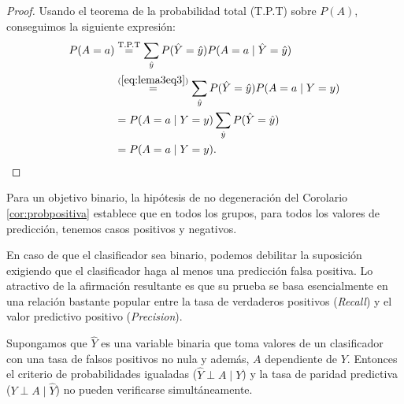 \documentclass[oneside,openright,titlepage,numbers=noenddot,openany,headinclude,footinclude=true,
cleardoublepage=empty,abstractoff,BCOR=5mm,paper=a4,fontsize=12pt,main=spanish]{scrreprt}
\begin{document}
\begin{proof}
Usando el teorema de la probabilidad total (T.P.T) sobre $P(A)$, conseguimos la siguiente expresión:
\begin{equation*}
\begin{split}
P(A=a)&\overset{\text{T.P.T}}{=}\sum_{\hat{y}}P(\hat{Y}=\hat{y})P(A=a \mid \hat{Y}=\hat{y})\\
&\overset{(\ref{eq:lema3eq3})}{=}\sum_{\hat{y}}P(\hat{Y}=\hat{y})P(A=a \mid Y=y)\\
&=P(A=a \mid Y=y)\sum_{\hat{y}}P(\hat{Y}=\hat{y})\\
&=P(A=a \mid Y=y).
\end{split}
\end{equation*}
\end{proof}

Para un objetivo binario, la hipótesis de no degeneración del Corolario  \ref{cor:probpositiva} establece que en todos los grupos, para todos los valores de predicción, tenemos casos positivos y negativos.

En caso de que el clasificador sea binario, podemos debilitar la suposición exigiendo que el clasificador haga al menos una predicción falsa positiva. Lo atractivo de la afirmación resultante es que su prueba se basa esencialmente en una relación bastante popular entre la tasa de verdaderos positivos (\textit{Recall}) y el valor predictivo positivo (\textit{Precision}).\\

\begin{lemma}
Supongamos que $\hat{Y}$ es una variable binaria que toma valores de un clasificador con una tasa de falsos positivos no nula y además, $A$ dependiente de $Y$. Entonces el criterio de probabilidades igualadas ($\hat{Y}\perp A \mid Y$) y la tasa de paridad predictiva ($Y\perp A \mid \hat{Y}$) no pueden verificarse simultáneamente.
\label{lem:preigual}
\end{lemma}
\end{document}
